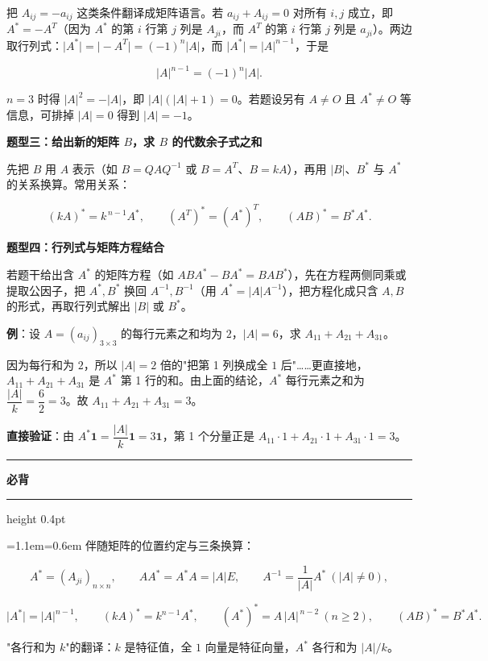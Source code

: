 \documentclass[11pt,openany,UTF8]{ctexbook}
\newcommand{\callouthead}[2]{%
  \par\addvspace{7pt}\noindent
  {\color{#1}\rule[-0.15em]{3pt}{1.05em}}\hspace{0.5em}%
  {\bfseries\color{#1}#2}\par\nobreak\vspace{-0.35em}%
  {\color{rulesep}\hrule height 0.4pt}\nobreak\vspace{0.45em}%
  \begingroup\small\setlength{\parindent}{0pt}%
  \leftskip=1.1em\rightskip=0.6em\noindent\ignorespaces}
\newcommand{\calloutend}{\par\endgroup\addvspace{7pt}}
\newenvironment{callkey}[1]{\callouthead{keybar}{#1}}{\calloutend}
\begin{document}
把 $A_{ij}=-a_{ij}$ 这类条件翻译成矩阵语言。若 $a_{ij}+A_{ij}=0$ 对所有 $i,j$ 成立，即 $A^*=-A^T$（因为 $A^*$ 的第 $i$ 行第 $j$ 列是 $A_{ji}$，而 $A^T$ 的第 $i$ 行第 $j$ 列是 $a_{ji}$）。两边取行列式：$\vert A^*\vert=\vert -A^T\vert=(-1)^n\vert A\vert$，而 $\vert A^*\vert=\vert A\vert^{n-1}$，于是

\[\vert A\vert^{n-1}=(-1)^n\vert A\vert .\]

$n=3$ 时得 $\vert A\vert^2=-\vert A\vert$，即 $\vert A\vert(\vert A\vert+1)=0$。若题设另有 $A\ne O$ 且 $A^*\ne O$ 等信息，可排掉 $\vert A\vert=0$ 得到 $\vert A\vert=-1$。

\textbf{题型三：给出新的矩阵 $B$，求 $B$ 的代数余子式之和}

先把 $B$ 用 $A$ 表示（如 $B=QAQ^{-1}$ 或 $B=A^T$、$B=kA$），再用 $\vert B\vert$、$B^*$ 与 $A^*$ 的关系换算。常用关系：

\[(kA)^*=k^{\,n-1}A^*,\qquad (A^T)^*=(A^*)^T,\qquad (AB)^*=B^*A^* .\]

\textbf{题型四：行列式与矩阵方程结合}

若题干给出含 $A^*$ 的矩阵方程（如 $ABA^*-BA^*=BAB^*$），先在方程两侧同乘或提取公因子，把 $A^*,B^*$ 换回 $A^{-1},B^{-1}$（用 $A^*=\vert A\vert A^{-1}$），把方程化成只含 $A,B$ 的形式，再取行列式解出 $\vert B\vert$ 或 $B^*$。

\textbf{例}：设 $A=(a_{ij})_{3\times3}$ 的每行元素之和均为 $2$，$\vert A\vert=6$，求 $A_{11}+A_{21}+A_{31}$。

因为每行和为 $2$，所以 $\vert A\vert=2$ 倍的"把第 1 列换成全 $1$ 后"……更直接地，$A_{11}+A_{21}+A_{31}$ 是 $A^*$ 第 1 行的和。由上面的结论，$A^*$ 每行元素之和为 $\dfrac{\vert A\vert}{k}=\dfrac{6}{2}=3$。故 $A_{11}+A_{21}+A_{31}=3$。

\textbf{直接验证}：由 $A^*\mathbf{1}=\dfrac{\vert A\vert}{k}\mathbf{1}=3\mathbf{1}$，第 1 个分量正是 $A_{11}\cdot1+A_{21}\cdot1+A_{31}\cdot1=3$。

\begin{callkey}{必背}
伴随矩阵的位置约定与三条换算：

\[A^*=(A_{ji})_{n\times n},\qquad AA^*=A^*A=\vert A\vert E,\qquad A^{-1}=\frac{1}{\vert A\vert}A^*\ (\vert A\vert\ne0),\]

\[\vert A^*\vert=\vert A\vert^{n-1},\qquad (kA)^*=k^{n-1}A^*,\qquad (A^*)^*=A\,\vert A\vert^{\,n-2}\ (n\ge2),\qquad (AB)^*=B^*A^* .\]

"各行和为 $k$"的翻译：$k$ 是特征值，全 $1$ 向量是特征向量，$A^*$ 各行和为 $\vert A\vert/k$。

\end{callkey}
\end{document}
